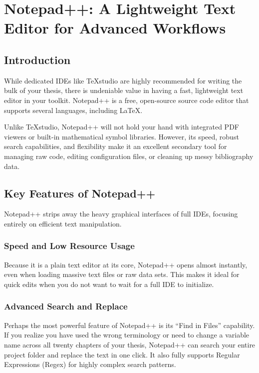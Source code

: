 \chapter{Notepad++: A Lightweight Text Editor for Advanced Workflows}\label{ch:notepadplusplus}
	\section{Introduction}\label{sec:NPPIntroduction}
		While dedicated IDEs like TeXstudio are highly recommended for writing the bulk of your thesis, there is undeniable value in having a fast, lightweight text editor in your toolkit. 
		Notepad++ is a free, open-source source code editor that supports several languages, including \LaTeX.
		
		Unlike TeXstudio, Notepad++ will not hold your hand with integrated PDF viewers or built-in mathematical symbol libraries. 
		However, its speed, robust search capabilities, and flexibility make it an excellent secondary tool for managing raw code, editing configuration files, or cleaning up messy bibliography data.
	
	\section{Key Features of Notepad++}
		Notepad++ strips away the heavy graphical interfaces of full IDEs, focusing entirely on efficient text manipulation.

		\subsection{Speed and Low Resource Usage}
			Because it is a plain text editor at its core, Notepad++ opens almost instantly, even when loading massive text files or raw data sets. 
			This makes it ideal for quick edits when you do not want to wait for a full IDE to initialize.

		\subsection{Advanced Search and Replace}
			Perhaps the most powerful feature of Notepad++ is its \enquote{Find in Files} capability. 
			If you realize you have used the wrong terminology or need to change a variable name across all twenty chapters of your thesis, Notepad++ can search your entire project folder and replace the text in one click. 
			It also fully supports Regular Expressions (Regex) for highly complex search patterns.
		
